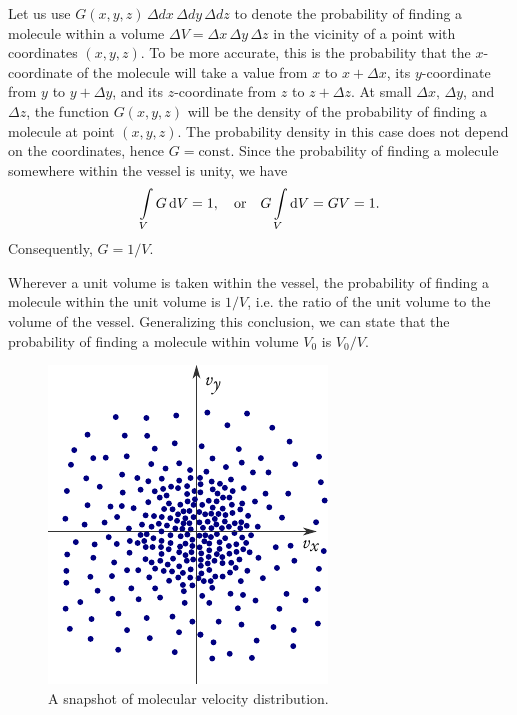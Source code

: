 Let us use $G (x, y, z) \, \Delta dx \, \Delta dy\, \Delta dz$ to denote the probability of finding a molecule within a volume $ \Delta V = \Delta x \, \Delta y \, \Delta z$ in the vicinity of a point with coordinates $(x, y, z)$. To be more accurate, this is the probability that the $x$-coordinate of the molecule will take a value from $x$ to $x + \Delta x$, its $y$-coordinate from $y$ to $y + \Delta y$, and its $z$-coordinate from $z$ to $z + \Delta z$. At small $ \Delta x, \, \Delta y$, and $ \Delta z$, the function $G(x, y, z)$ will be the density of the probability of finding a molecule at point $(x, y, z)$. The probability density in this case does not depend on the coordinates, hence $G = \text{const}$. Since the probability of finding a molecule somewhere within the vessel is unity, we have
\begin{equation*}%
\int\limits_{V} G \, \dd V =1,  \qor  G \int\limits_{V}  \dd V = GV = 1.
\end{equation*}
Consequently, $G = 1/V$. 

Wherever a unit volume is taken within the vessel, the probability of finding a molecule within the unit volume is $1/V$, i.e. the ratio of the unit volume to the volume of the vessel. Generalizing this conclusion, we can state that the probability of finding a molecule within volume $V_{0}$ is $V_{0}/V$.

\begin{figure}%
\centering
\includegraphics[width=\textwidth]{figures/mol-dist.pdf}
\caption{A snapshot of molecular velocity distribution.}
\label{mol-dist}
\end{figure}

